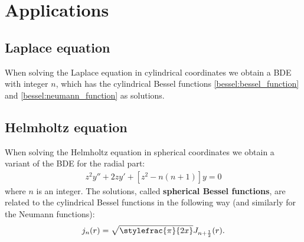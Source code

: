 \section{Applications}
\subsection{Laplace equation}

	When solving the Laplace equation in cylindrical coordinates we obtain a BDE with integer $n$, which has the cylindrical Bessel functions \ref{bessel:bessel_function} and \ref{bessel:neumann_function} as solutions.
    
\subsection{Helmholtz equation}

	When solving the Helmholtz equation in spherical coordinates we obtain a variant of the BDE for the radial part:
	\begin{gather}
		z^2y'' + 2zy' + [z^2 - n(n+1)]y = 0
	\end{gather}
	where $n$ is an integer. The solutions, called \textbf{spherical Bessel functions}, are related to the cylindrical Bessel functions in the following way (and similarly for the Neumann functions):
	\begin{gather}
		j_n(r) = \sqrt{\stylefrac{\pi}{2x}}J_{n + \frac{1}{2}}(r).
	\end{gather}
